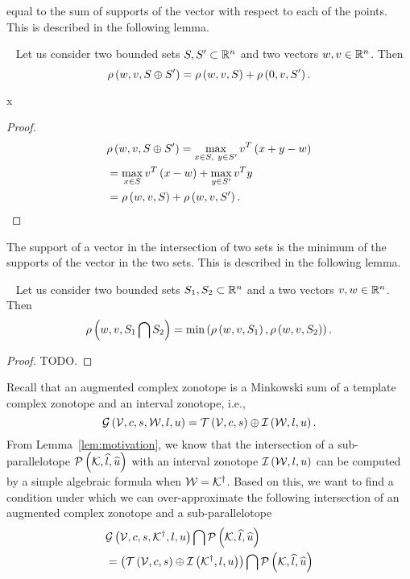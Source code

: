 equal to the sum of supports of the vector with respect to each of the
points.  This is described in the following lemma.
%
\begin{lemma}~\label{lem:support-minsum}
Let us consider two bounded sets $S,S^\prime\subset\mathbb{R}^n$ and two
vectors $w,v\in\mathbb{R}^n$.  Then
%
\[
\rho\left(w,v,S\oplus S^\prime\right)=\rho\left(w,v,S\right)+\rho\left(0,v,S^\prime\right).
\]
%
\end{lemma}
x%
\begin{proof}
  \begin{align*}
& \rho\left(w,v,S\oplus S^\prime\right)=\max_{x\in S,~y\in
      S^\prime}v^T\left(x+y-w\right)\\
    & = \max_{x\in S}v^T\left(x-w\right)+\max_{y\in S^\prime}v^Ty\\
    & = \rho\left(w,v,S\right)+\rho\left(w,v,S^\prime\right).~~~~~~~~~~\qedhere
  \end{align*}
\end{proof}
%
The support of a vector in the intersection of two sets is the minimum
of the supports of the vector in the two sets.  This is described in
the following lemma.
%
\begin{lemma}~\label{lem:support-intersection}
Let us consider two bounded sets $S_1,S_2\subset\mathbb{R}^n$ and a two
vectors $v,w\in\mathbb{R}^n$.  Then
%
\[
\rho\left(w,v,S_1\bigcap S_2\right)=\min\left(\rho\left(w,v,S_1\right),\rho\left(w,v,S_2\right)\right).
\]
%
\end{lemma}
%
\begin{proof}
  {\color{red} TODO}.
\end{proof}
%
Recall that an augmented complex zonotope is a Minkowski sum of a
template complex zonotope and an interval zonotope, i.e.,
%
\[
\mathcal{G}\left(\mathcal{V},c,s,\mathcal{W},l,u\right)=\mathit{\operatorname{\mathcal{T}}}\left(\mathcal{V},c,s\right)\oplus \mathit{\operatorname{\mathcal{I}}}\left(\mathcal{W},l,u\right).
\]
%
From
Lemma~\ref{lem:motivation}, we know that the intersection of a
sub-parallelotope $\mathcal{P}\left(\mathcal{K},\widehat{l},\widehat{u}\right)$ with an interval
zonotope $\mathit{\operatorname{\mathcal{I}}}\left(\mathcal{W},l,u\right)$ can be computed by a simple
algebraic formula when
$\mathcal{W}={\mathcal{K}}^\dagger$.  Based on this, we want to find a condition
under which we can over-approximate the following intersection of an
augmented complex zonotope and a sub-parallelotope
%
\begin{align*}
& \mathcal{G}\left(\mathcal{V},c,s,{\mathcal{K}}^\dagger,l,u\right)\bigcap \mathcal{P}\left(\mathcal{K},\widehat{l},\widehat{u}\right)\\
& =\left(\mathit{\operatorname{\mathcal{T}}}\left(\mathcal{V},c,s\right)\oplus \mathit{\operatorname{\mathcal{I}}}\left({\mathcal{K}}^\dagger,l,u\right)\right)\bigcap \mathcal{P}\left(\mathcal{K},\widehat{l},\widehat{u}\right)
\end{align*}
